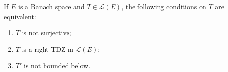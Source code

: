 If $E$ is a Banach space and $T \in \mathcal{L}(E)$, the following conditions on $T$ are equivalent:
\begin{enumerate}
\item[(a)] $T$ is not surjective;
\item[(b)] $T$ is a right TDZ in $\mathcal{L}(E)$;
\item[(c)] $T'$ is not bounded below.
\end{enumerate}
